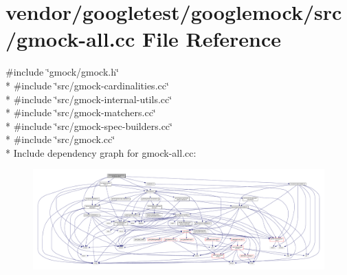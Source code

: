 \hypertarget{gmock-all_8cc}{}\section{vendor/googletest/googlemock/src/gmock-\/all.cc File Reference}
\label{gmock-all_8cc}
{\ttfamily \#include \char`\"{}gmock/gmock.\+h\char`\"{}}\\*
{\ttfamily \#include \char`\"{}src/gmock-\/cardinalities.\+cc\char`\"{}}\\*
{\ttfamily \#include \char`\"{}src/gmock-\/internal-\/utils.\+cc\char`\"{}}\\*
{\ttfamily \#include \char`\"{}src/gmock-\/matchers.\+cc\char`\"{}}\\*
{\ttfamily \#include \char`\"{}src/gmock-\/spec-\/builders.\+cc\char`\"{}}\\*
{\ttfamily \#include \char`\"{}src/gmock.\+cc\char`\"{}}\\*
Include dependency graph for gmock-\/all.cc\+:
\nopagebreak
\begin{figure}[H]
\begin{center}
\leavevmode
\includegraphics[width=350pt]{gmock-all_8cc__incl}
\end{center}
\end{figure}
